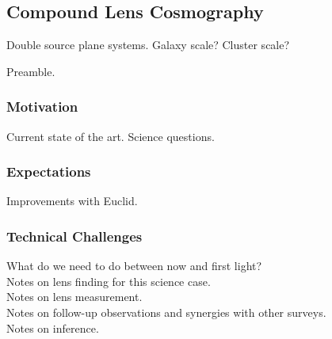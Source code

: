 \documentclass{article}
\begin{document}

\subsection{Compound Lens Cosmography}



Double source plane systems. Galaxy scale? Cluster scale?


Preamble.

\subsubsection{Motivation}
Current state of the art. Science questions.\\

\subsubsection{Expectations}
Improvements with Euclid.\\

\subsubsection{Technical Challenges}

What do we need to do between now and first light?\\

Notes on lens finding for this science case.\\

Notes on lens measurement.\\

Notes on follow-up observations and synergies with other surveys.\\

Notes on inference.\\




\vspace{30pt}
\end{document}
